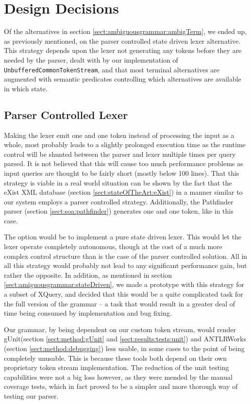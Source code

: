 \section{Design Decisions}
\label{sect:discussion:designDecisions}

Of the alternatives in section \ref{sect:ambiguousgrammar:ambigTerm}, we ended up, as previously mentioned, on the parser controlled state driven lexer alternative. This strategy depends upon the lexer not generating any tokens before they are needed by the parser, dealt with by our implementation of \verb!UnbufferedCommonTokenStream!, and that most terminal alternatives are augmented with semantic predicates controlling which alternatives are available in which state.

\subsection{Parser Controlled Lexer}
Making the lexer emit one and one token instead of processing the input as a
whole, most probably leads to a slightly prolonged execution time as the
runtime control will be shunted between the parser and lexer multiple times
per query parsed. It is not believed that this will cause too much performance 
problems as input queries are thought to be fairly short (mostly below 100
lines). That this strategy is viable in a real world situation can be shown by
the fact that the eXist XML database (section \ref{sect:stateOfTheArt:eXist}) in
a manner similar to our system employs a parser controlled strategy.
Additionally, the Pathfinder parser (section \ref{sect:soa:pathfinder})
generates one and one token, like in this case.

The option would be to implement a pure state driven lexer. This would let the
lexer operate completely autonomous, though at the cost of a much more complex
control structure than is the case of the parser controlled solution. All in
all this strategy would probably not lead to any significant performance gain,
but rather the opposite. In addition, as mentioned in section
\ref{sect:amiguousgrammar:stateDriven}, we made a prototype with this strategy
for a subset of XQuery, and decided that this would be a quite complicated task
for the full version of the grammar -- a task that would result in a greater
deal of time being consumed by implementation and bug fixing.

Our grammar, by being dependent on our custom token stream, would render
gUnit(section \ref{sect:method:gUnit} and \ref{sect:results:tests:unit}) and
ANTLRWorks (section \ref{sect:method:debugging}) less usable, in some cases to
the point of being completely unusable. This is because these tools both depend
on their own proprietary token stream implementation. The reduction of the unit
testing capabilities were not a big loss however, as they were mended by the
manual coverage tests, which in fact proved to be a simpler and more thorough
way of testing our parser.

